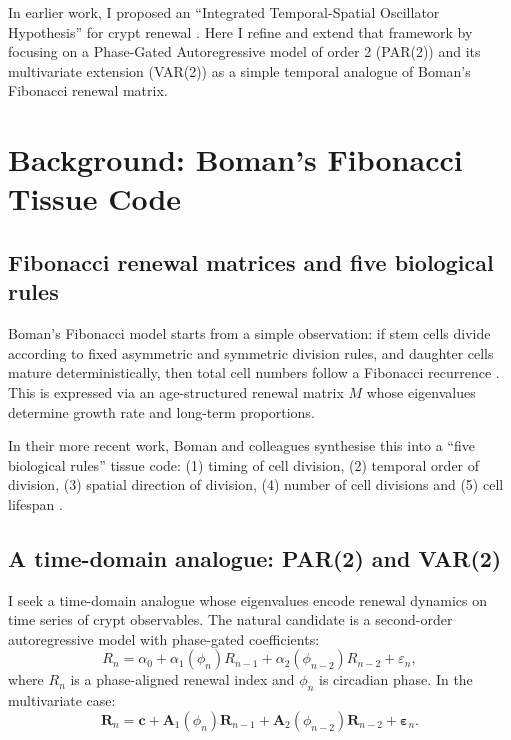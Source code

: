 \documentclass[11pt,letterpaper]{article}
\theoremstyle{definition}
\theoremstyle{remark}
\begin{document}
In earlier work, I proposed an ``Integrated Temporal-Spatial Oscillator Hypothesis'' for crypt renewal \citep{whiteside2025integrated}. Here I refine and extend that framework by focusing on a Phase-Gated Autoregressive model of order 2 (PAR(2)) and its multivariate extension (VAR(2)) as a simple temporal analogue of Boman's Fibonacci renewal matrix.

\section{Background: Boman's Fibonacci Tissue Code}

\subsection{Fibonacci renewal matrices and five biological rules}

Boman's Fibonacci model starts from a simple observation: if stem cells divide according to fixed asymmetric and symmetric division rules, and daughter cells mature deterministically, then total cell numbers follow a Fibonacci recurrence \citep{boman2017fibonacci}. This is expressed via an age-structured renewal matrix $M$ whose eigenvalues determine growth rate and long-term proportions.

In their more recent work, Boman and colleagues synthesise this into a ``five biological rules'' tissue code: (1) timing of cell division, (2) temporal order of division, (3) spatial direction of division, (4) number of cell divisions and (5) cell lifespan \citep{boman2025dynamic}.

\subsection{A time-domain analogue: PAR(2) and VAR(2)}

I seek a time-domain analogue whose eigenvalues encode renewal dynamics on time series of crypt observables. The natural candidate is a second-order autoregressive model with phase-gated coefficients:
\begin{equation}
R_n = \alpha_0 + \alpha_1(\phi_n) R_{n-1} + \alpha_2(\phi_{n-2}) R_{n-2} + \varepsilon_n,
\label{eq:par2}
\end{equation}
where $R_n$ is a phase-aligned renewal index and $\phi_n$ is circadian phase. In the multivariate case:
\begin{equation}
\mathbf{R}_n = \mathbf{c} + \mathbf{A}_1(\phi_n)\mathbf{R}_{n-1} + \mathbf{A}_2(\phi_{n-2})\mathbf{R}_{n-2} + \boldsymbol{\varepsilon}_n.
\label{eq:var2}
\end{equation}
\end{document}
